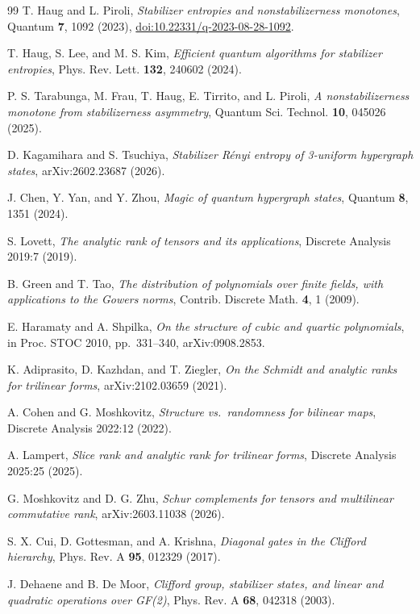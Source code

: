 \documentclass[a4paper,onecolumn,11pt,unpublished]{quantumarticle}
\theoremstyle{plain}
\theoremstyle{remark}
\begin{document}
\begin{thebibliography}{99}
 T. Haug and L. Piroli, \emph{Stabilizer entropies and nonstabilizerness monotones}, Quantum \textbf{7}, 1092 (2023), \href{https://doi.org/10.22331/q-2023-08-28-1092}{doi:10.22331/q-2023-08-28-1092}.

 T. Haug, S. Lee, and M. S. Kim, \emph{Efficient quantum algorithms for stabilizer entropies}, Phys. Rev. Lett. \textbf{132}, 240602 (2024).

 P. S. Tarabunga, M. Frau, T. Haug, E. Tirrito, and L. Piroli, \emph{A nonstabilizerness monotone from stabilizerness asymmetry}, Quantum Sci. Technol. \textbf{10}, 045026 (2025).

 D. Kagamihara and S. Tsuchiya, \emph{Stabilizer R\'enyi entropy of 3-uniform hypergraph states}, arXiv:2602.23687 (2026).

 J. Chen, Y. Yan, and Y. Zhou, \emph{Magic of quantum hypergraph states}, Quantum \textbf{8}, 1351 (2024).

 S. Lovett, \emph{The analytic rank of tensors and its applications}, Discrete Analysis 2019:7 (2019).

 B. Green and T. Tao, \emph{The distribution of polynomials over finite fields, with applications to the Gowers norms}, Contrib. Discrete Math. \textbf{4}, 1 (2009).

 E. Haramaty and A. Shpilka, \emph{On the structure of cubic and quartic polynomials}, in Proc. STOC 2010, pp.~331--340, arXiv:0908.2853.

 K. Adiprasito, D. Kazhdan, and T. Ziegler, \emph{On the Schmidt and analytic ranks for trilinear forms}, arXiv:2102.03659 (2021).

 A. Cohen and G. Moshkovitz, \emph{Structure vs.\ randomness for bilinear maps}, Discrete Analysis 2022:12 (2022).

 A. Lampert, \emph{Slice rank and analytic rank for trilinear forms}, Discrete Analysis 2025:25 (2025).

 G. Moshkovitz and D. G. Zhu, \emph{Schur complements for tensors and multilinear commutative rank}, arXiv:2603.11038 (2026).

 S. X. Cui, D. Gottesman, and A. Krishna, \emph{Diagonal gates in the Clifford hierarchy}, Phys. Rev. A \textbf{95}, 012329 (2017).

 J. Dehaene and B. De Moor, \emph{Clifford group, stabilizer states, and linear and quadratic operations over GF(2)}, Phys. Rev. A \textbf{68}, 042318 (2003).


\end{thebibliography}
\end{document}
